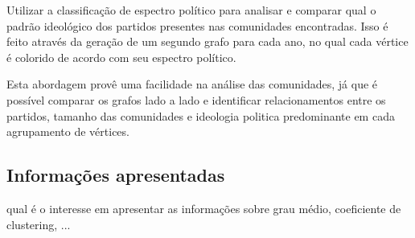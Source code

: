 Utilizar a classificação de espectro político para analisar e comparar qual o padrão ideológico dos partidos presentes nas comunidades encontradas. Isso é feito através da geração de um segundo grafo para cada ano, no qual cada vértice é colorido de acordo com seu espectro político.

Esta abordagem provê uma facilidade na análise das comunidades, já que é possível comparar os grafos lado a lado e identificar relacionamentos entre os partidos, tamanho das comunidades e ideologia politica predominante em cada agrupamento de vértices.
\subsection{Informações apresentadas}
\label{proposta__objetivos-especificos--informacoes-apresentadas}

qual é o interesse em apresentar as informações sobre grau médio, coeficiente de clustering, ...
